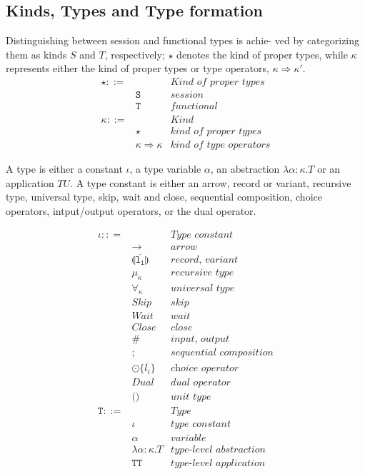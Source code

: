 \documentclass[sigplan]{acmart}
\begin{document}
\subsection{Kinds, Types and Type formation}
Distinguishing between session and functional types is achie-
ved by categorizing them as kinds $S$ and $T$, respectively; $\star$ denotes the kind of proper types, while $\kappa$ represents either the kind of proper types or type operators, $\kappa\Rightarrow\kappa'$.
\begin{align*}
  \mathtt \star ::= & & \textit{Kind of proper types}\\
  & \mathtt S & \textit{session}\\
  & \mathtt T & \textit{functional}\\
  \mathtt \kappa ::= && \textit{Kind}\\
  & \mathtt \star & \textit{kind of proper types}\\
  & \mathtt \kappa \Rightarrow \kappa & \textit{kind of type operators}
\end{align*}

A type is either a constant $\iota$, a type variable $\alpha$, an abstraction $\lambda\alpha\colon\kappa.T$ or an application $T U$. A type constant is either an arrow, record or variant, recursive type, universal type, skip, wait and close, sequential composition, choice operators, intput/output operators, or the dual operator.

\begin{align*}
  \mathtt \iota :: = & & \textit{Type constant}\\
  & \mathtt \rightarrow & \textit{arrow}\\
  & \mathtt {\llparenthesis\overline{l_i}\rrparenthesis} & \textit{record, variant}\\
  & \mathtt \mu_\kappa & \textit{recursive type}\\
  & \mathtt \forall_\kappa & \textit{universal type}\\
  & \mathit{Skip} & \textit{skip}\\
  & \mathit{Wait} & \textit{wait}\\
  & \mathit{Close} & \textit{close}\\
  & \mathtt \# & \textit{input, output}\\
  & \mathtt ; & \textit{sequential composition}\\
  & \mathtt \odot \{\overline{l_i}\} & \textit{choice operator}\\
  & \mathit{Dual} & \textit{dual operator}\\
  & \mathtt () & \textit{unit type}\\
  \mathtt T ::= && \textit{Type}\\
  & \mathtt \iota & \textit{type constant}\\
  & \mathtt \alpha & \textit{variable}\\
  & \mathtt \lambda\alpha\colon\kappa.T & \textit{type-level abstraction}\\
  & \mathtt {T T} & \textit{type-level application}
\end{align*}
\vspace{3mm}
\end{document}
